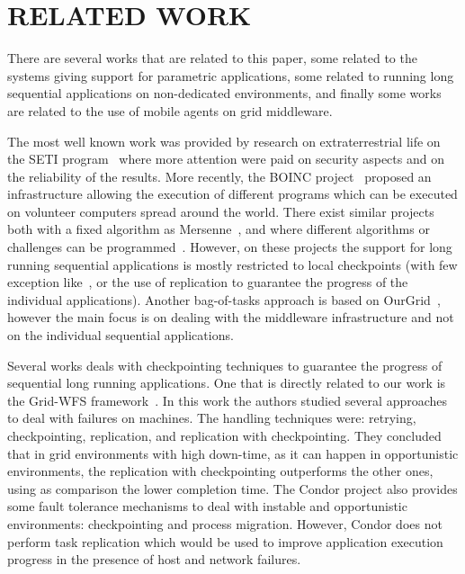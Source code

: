 \documentclass{cpeauth}
\begin{document}
\section{RELATED WORK}

There are several works that are related to this paper, some related to the
systems giving support for parametric applications, some related to
running long sequential applications on non-dedicated environments, and finally
some works are related to the use of mobile agents on grid middleware.

The most well known work was provided by research on extraterrestrial life on
the SETI program~\cite{seti} where more attention were paid on security aspects
and on the reliability of the results. More recently, the BOINC
project~\cite{boinc} proposed an infrastructure allowing the execution of
different programs which can be executed on volunteer computers spread around
the world. There exist similar projects both with a fixed algorithm as
Mersenne~\cite{mersenne}, and where different algorithms or challenges can be
programmed~\cite{distributed}. However, on these projects the support for long
running sequential applications is mostly restricted to local checkpoints (with
few exception like~\cite{climate}, or the use of replication to guarantee the
progress of the individual applications). Another bag-of-tasks approach is
based on OurGrid~\cite{cirne06}, however the main focus is on dealing with
the middleware infrastructure and not on the individual sequential
applications.

Several works deals with checkpointing techniques to guarantee the progress of
sequential long running applications. One that is directly related to our
work is the Grid-WFS framework~\cite{hwang03}. In this work the authors studied several approaches to
deal with failures on machines. The handling techniques were: retrying, checkpointing,
replication, and replication with checkpointing. They concluded that in grid
environments with high down-time, as it can happen in opportunistic environments,
the replication with checkpointing outperforms the other ones, using as comparison
the lower completion time. The Condor project also provides some fault tolerance mechanisms
to deal with instable and opportunistic environments: checkpointing and process
migration. However, Condor does not perform task replication which would be
used to improve application execution progress in the presence of host and
network failures.
\end{document}
